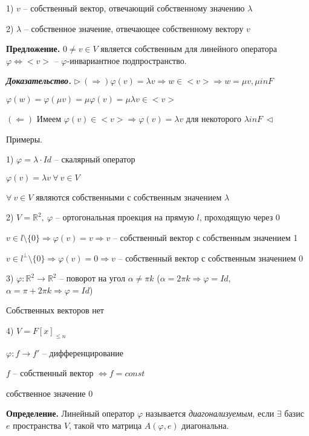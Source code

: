 1) $v$ -- собственный вектор, отвечающий собственному значению $\lambda$

2) $\lambda$ -- собственное значение, отвечающее собственному вектору $v$

\vspace{\baselineskip}
\textbf{Предложение.} $0 \neq v \in V$ является собственным для линейного оператора $\varphi \Leftrightarrow <v>$ -- $\varphi$-инвариантное подпространство.

\vspace{\baselineskip}
\textbf{\textit{Доказательство.}} $\rhd \ (\Rightarrow) \varphi(v) = \lambda v \Rightarrow w \in <v> \Rightarrow w = \mu v, \mu in F$

$\varphi(w) = \varphi(\mu v) = \mu \varphi(v) = \mu \lambda v \in <v>$

$(\Leftarrow)$ Имеем $\varphi(v) \in <v> \Rightarrow \varphi(v) = \lambda v$ для некоторого $\lambda in F \ \lhd$

\vspace{\baselineskip}
Примеры.

1) $\varphi = \lambda \cdot Id$ -- скалярный оператор

$\varphi(v) = \lambda v \ \forall \ v \in V$

$\forall \ v \in V$ являются собственными с собственным значением $\lambda$

2) $V = \mathbb{R}^2, \ \varphi$ -- ортогональная проекция на прямую $l$, проходящую через 0

$v \in l \setminus \{0\} \Rightarrow \varphi(v) = v \Rightarrow v$ -- собственный вектор с собственным значением 1

$v \in l^{\bot} \setminus \{0\} \Rightarrow \varphi(v) = 0 \Rightarrow v$ -- собственный вектор с собственным значением 0

3) $\varphi: \mathbb{R}^2 \rightarrow \mathbb{R}^2$ -- поворот на угол $\alpha \neq \pi k$ ($\alpha = 2 \pi k \Rightarrow \varphi = Id$, $\alpha = \pi + 2 \pi k \Rightarrow \varphi = Id$)

Собственных векторов нет

4) $V = F[x]_{\leq n}$

$\varphi: f \rightarrow f'$ -- дифференцирование

$f$ -- собственный вектор $\Leftrightarrow f = const$

собственное значение 0

\vspace{\baselineskip}
\textbf{Определение.} Линейный оператор $\varphi$ называется \textit{диагонализуемым}, если $\exists$ базис $e$ пространства $V$, такой что матрица $A(\varphi, e)$ диагональна.

